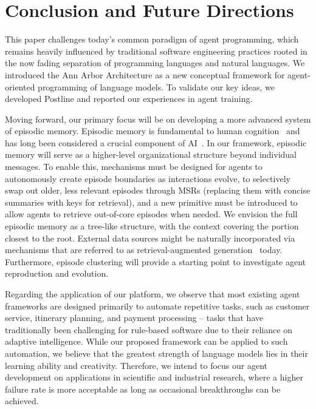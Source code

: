 \section{Conclusion and Future Directions}

This paper challenges today's common paradigm of agent programming, which remains heavily influenced by traditional software engineering practices rooted in the now fading separation of programming languages and natural languages. We introduced the Ann Arbor Architecture as a new conceptual framework for agent-oriented programming of language models. To validate our key ideas, we developed Postline and reported our experiences in agent training.

Moving forward, our primary focus will be on developing a more advanced system of episodic memory. Episodic memory is fundamental to human cognition~\cite{tulving72} and has long been considered a crucial component of AI~\cite{soar}. In our framework, episodic memory will serve as a higher-level organizational structure beyond individual messages. To enable this, mechanisms must be designed for agents to autonomously create episode boundaries as interactions evolve, to selectively swap out older, less relevant episodes through MSRs (replacing them with concise summaries with keys for retrieval), and a new primitive must be introduced to allow agents to retrieve out-of-core episodes when needed.  We envision the full episodic memory as a tree-like structure, with the context covering the portion closest to the root. External data sources might be naturally incorporated via mechanisms that are referred to as retrieval-augmented generation~\cite{rag, gao24rag} today. 
Furthermore, episode clustering will provide a starting point to investigate agent reproduction and evolution.

Regarding the application of our platform, we observe that most existing agent frameworks are designed primarily to automate repetitive tasks, such as customer service, itinerary planning, and payment processing -- tasks that have traditionally been challenging for rule-based software due to their reliance on adaptive intelligence. While our proposed framework can be applied to such automation, we believe that the greatest strength of language models lies in their learning ability and creativity. Therefore, we intend to focus our agent development on applications in scientific and industrial research, where a higher failure rate is more acceptable as long as occasional breakthroughs can be achieved.
